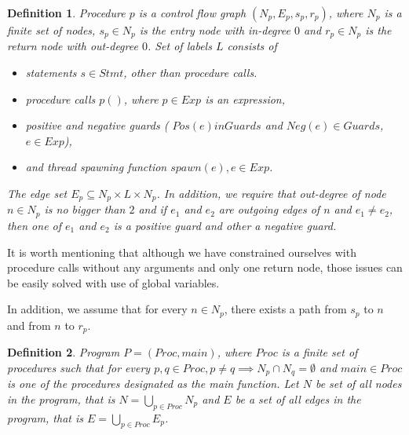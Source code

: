 \documentclass[..thesis.tex]{subfiles}
\newtheorem{defin}{Definition}[section]
\begin{document}
\begin{defin}
Procedure $p$ is a \textit{control flow graph} $\left( N_p,E_p,s_p,r_p \right)$, where $N_p$ is a finite set of nodes, $s_p \in N_p$
 is the \textit{entry} node with in-degree $0$ and  $r_p \in N_p$ is the \textit{return} node with out-degree $0$. Set of labels $L$ consists of
\begin{itemize}
\item statements $s \in Stmt$, other than procedure calls.
\item procedure calls $p()$, where $p \in Exp$ is an expression, 
\item positive and negative guards ( $Pos\left( e \right) in Guards$ and  $Neg \left( e \right) \in Guards$, $e \in Exp$),
\item and thread spawning function $spawn\left( e \right), e \in Exp$.  
\end{itemize}
The edge set  $E_p \subseteq N_p \times L \times N_p$. In addition, we require that out-degree of node $n \in N_p$ is no bigger than $2$ 
and if $e_1$ and $e_2$ are outgoing edges of $n$ and $e_1 \neq e_2$, then one of $e_1$ and $e_2$ is a positive guard and other a negative guard. 
\end{defin}

It is worth mentioning that although we have constrained ourselves with procedure calls without any arguments and only one return node,
 those issues can be easily solved with use of global variables. 

In addition, we assume that for every $n \in N_p$, there exists a path from $s_p$ to $n$ and from $n$ to $r_p$.  

\begin{defin}
Program $P = \left( Proc, main \right)$, where $Proc$ is a finite set of procedures such that for every $p,q \in Proc, p \neq q \implies N_p \cap N_q = \emptyset$ 
and $main \in Proc$ is one of the procedures designated as the main function.
 Let $N$ be set of all nodes in the program, that is $N = \bigcup_{p \in Proc}N_p$ and $E$ be a set of all edges in the program, that is $E = \bigcup_{p \in Proc}E_p$. 
\end{defin}
\end{document}
